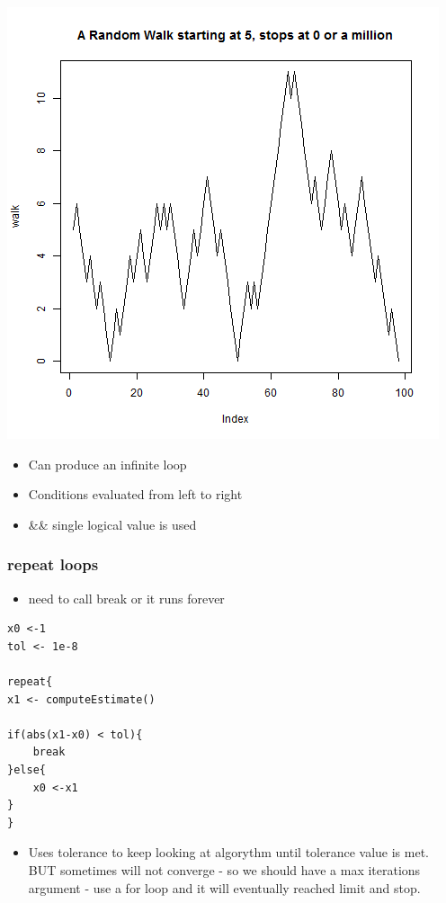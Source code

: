 \documentclass[11pt]{article}
\begin{document}
\includegraphics[width=.9\linewidth]{walk1.png}

\begin{itemize}
\item Can produce an infinite loop
\item Conditions evaluated from left to right
\item \&\& single logical value is used
\end{itemize}
\subsubsection{repeat loops}
\label{sec-2-1-4}

\begin{itemize}
\item need to call break or it runs forever
\end{itemize}

\begin{verbatim}
x0 <-1
tol <- 1e-8

repeat{
x1 <- computeEstimate()

if(abs(x1-x0) < tol){
    break
}else{
    x0 <-x1
}
}
\end{verbatim}
\begin{itemize}
\item Uses tolerance to keep looking at algorythm until tolerance value
  is met. BUT sometimes will not converge - so we should have a max
  iterations argument - use a for loop and it will eventually reached
  limit and stop.
\end{itemize}
\end{document}
